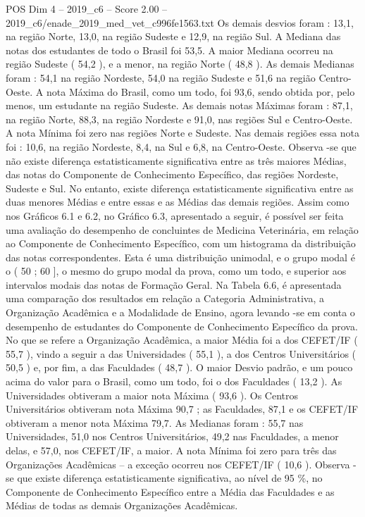 \begin{textsample}{POS Dim 4 – 2019\_c6 – Score 2.00 – 2019\_c6/enade\_2019\_med\_vet\_c996fe1563.txt}
Os demais desvios foram : 13,1, na região Norte, 13,0, na região Sudeste e 12,9, na região Sul.
A Mediana das notas dos estudantes de todo o Brasil foi 53,5.
A maior Mediana ocorreu na região Sudeste ( 54,2 ), e a menor, na região Norte ( 48,8 ).
As demais Medianas foram : 54,1 na região Nordeste, 54,0 na região Sudeste e 51,6 na região Centro-Oeste.
A nota Máxima do Brasil, como um todo, foi 93,6, sendo obtida por, pelo menos, um estudante na região Sudeste.
As demais notas Máximas foram : 87,1, na região Norte, 88,3, na região Nordeste e 91,0, nas regiões Sul e Centro-Oeste.
A nota Mínima foi zero nas regiões Norte e Sudeste.
Nas demais regiões essa nota foi : 10,6, na região Nordeste, 8,4, na Sul e 6,8, na Centro-Oeste.
Observa -se que não existe diferença estatisticamente significativa entre as três maiores Médias, das notas do Componente de Conhecimento Específico, das regiões Nordeste, Sudeste e Sul.
No entanto, existe diferença estatisticamente significativa entre as duas menores Médias e entre essas e as Médias das demais regiões.
Assim como nos Gráficos 6.1 e 6.2, no Gráfico 6.3, apresentado a seguir, é possível ser feita uma avaliação do desempenho de concluintes de Medicina Veterinária, em relação ao Componente de Conhecimento Específico, com um histograma da distribuição das notas correspondentes.
Esta é uma distribuição unimodal, e o grupo modal é o ( 50 ; 60 ], o mesmo do grupo modal da prova, como um todo, e superior aos intervalos modais das notas de Formação Geral.
Na Tabela 6.6, é apresentada uma comparação dos resultados em relação a Categoria Administrativa, a Organização Acadêmica e a Modalidade de Ensino, agora levando -se em conta o desempenho de estudantes do Componente de Conhecimento Específico da prova.
No que se refere a Organização Acadêmica, a maior Média foi a dos CEFET/IF ( 55,7 ), vindo a seguir a das Universidades ( 55,1 ), a dos Centros Universitários ( 50,5 ) e, por fim, a das Faculdades ( 48,7 ).
O maior Desvio padrão, e um pouco acima do valor para o Brasil, como um todo, foi o dos Faculdades ( 13,2 ).
As Universidades obtiveram a maior nota Máxima ( 93,6 ).
Os Centros Universitários obtiveram nota Máxima 90,7 ; as Faculdades, 87,1 e os CEFET/IF obtiveram a menor nota Máxima 79,7.
As Medianas foram : 55,7 nas Universidades, 51,0 nos Centros Universitários, 49,2 nas Faculdades, a menor delas, e 57,0, nos CEFET/IF, a maior.
A nota Mínima foi zero para três das Organizações Acadêmicas – a exceção ocorreu nos CEFET/IF ( 10,6 ).
Observa -se que existe diferença estatisticamente significativa, ao nível de 95 \%, no Componente de Conhecimento Específico entre a Média das Faculdades e as Médias de todas as demais Organizações Acadêmicas.

\end{textsample}
